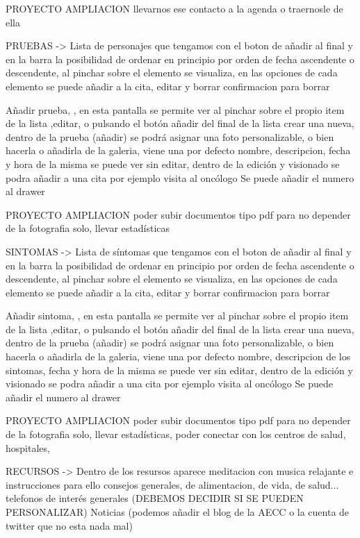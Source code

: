 \documentclass[../pfc.tex]{subfiles}
\begin{document}
	PROYECTO AMPLIACION llevarnos ese contacto a la agenda o traernosle de ella
	
	PRUEBAS -> 	 	Lista de personajes que tengamos con el boton de añadir al final y en la barra la posibilidad de ordenar en principio por orden de fecha ascendente o descendente,
	al pinchar sobre el elemento se visualiza, 
	en las opciones de cada elemento se puede añadir a la cita, editar y borrar confirmacion para borrar
	
	Añadir prueba, , en esta pantalla se permite ver al pinchar sobre el propio item de la lista ,editar, o pulsando el botón añadir del final de la lista crear una nueva, 
	dentro de la prueba (añadir) se podrá asignar una foto personalizable, o bien hacerla o añadirla de la galeria, viene una por defecto
	nombre, descripcion,
	fecha y hora de la misma
	se puede ver sin editar, dentro de la edición y visionado se podra añadir a una cita por ejemplo visita al oncólogo
	Se puede añadir el numero al drawer
	
	PROYECTO AMPLIACION poder subir documentos tipo pdf para no depender de la fotografia solo, llevar estadísticas
	
	SINTOMAS ->  	Lista de síntomas que tengamos con el boton de añadir al final y en la barra la posibilidad de ordenar en principio por orden de fecha ascendente o descendente,
	al pinchar sobre el elemento se visualiza, 
	en las opciones de cada elemento se puede añadir a la cita, editar y borrar confirmacion para borrar
	
	Añadir sintoma, , en esta pantalla se permite ver al pinchar sobre el propio item de la lista ,editar, o pulsando el botón añadir del final de la lista crear una nueva, 
	dentro de la prueba (añadir) se podrá asignar una foto personalizable, o bien hacerla o añadirla de la galeria, viene una por defecto
	nombre, descripcion de los sintomas,
	fecha y hora de la misma
	se puede ver sin editar, dentro de la edición y visionado se podra añadir a una cita por ejemplo visita al oncólogo
	Se puede añadir el numero al drawer
	
	PROYECTO AMPLIACION poder subir documentos tipo pdf para no depender de la fotografia solo, llevar estadísticas, poder conectar con los centros de salud, hospitales, 
	
	RECURSOS  -> 	Dentro de los resursos aparece meditacion con musica relajante e instrucciones para ello
	consejos generales, de alimentacion, de vida, de salud...
	telefonos de interés generales (DEBEMOS DECIDIR SI SE PUEDEN PERSONALIZAR)
	Noticias (podemos añadir el blog de la AECC o la cuenta de twitter que no esta nada mal)
	
\end{document}
